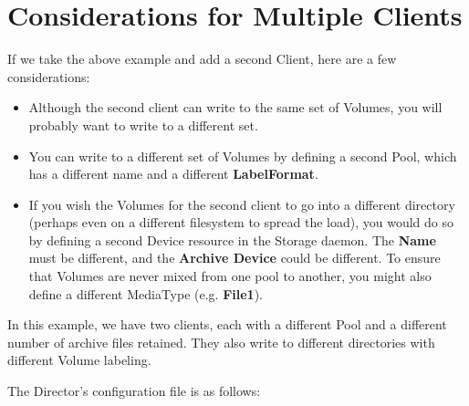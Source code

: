 \label{MultipleClients}
\section{Considerations for Multiple Clients}

If we take the above example and add a second Client, here are a few
considerations:

\begin{itemize}
\item Although the second client can write to the same set of  Volumes, you
   will probably want to write to a different  set.
\item You can write to a different set of Volumes by defining  a second Pool,
   which has a different name and a different  {\bf LabelFormat}.
\item If you wish the Volumes for the second client to go into  a different
   directory (perhaps even on a different filesystem  to spread the load), you
   would do so by defining a second  Device resource in the Storage daemon. The
{\bf Name}  must be different, and the {\bf Archive Device} could  be
different. To ensure that Volumes are never mixed from  one pool to another,
you might also define a different  MediaType (e.g. {\bf File1}).
\end{itemize}

In this example, we have two clients, each with a different Pool and a
different number of archive files retained. They also write to different
directories with different Volume labeling.

The Director's configuration file is as follows:

